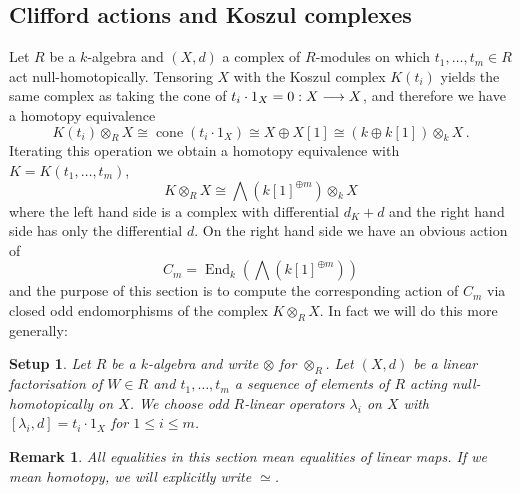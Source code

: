 \documentclass[english,letter paper,12pt,leqno]{article}
\newtheorem{setup}[theorem]{Setup}
\theoremstyle{example}
\newtheorem{remark}[theorem]{Remark}
\numberwithin{equation}{section}
\def\be{\begin{equation}}
\def\ee{\end{equation}}
\DeclareMathOperator{\End}{End}
\begin{document}
\subsection{Clifford actions and Koszul complexes}\label{section:cliffordactkos}

Let $R$ be a $k$-algebra and $(X,d)$ a complex of $R$-modules on which $t_1,\ldots,t_m \in R$ act null-homotopically. Tensoring $X$ with the Koszul complex $K(t_i)$ yields the same complex as taking the cone of $t_i \cdot 1_X = 0: X \longrightarrow X$, and therefore we have a homotopy equivalence
\be
K(t_i) \otimes_R X \cong \operatorname{cone}( t_i \cdot 1_X ) \cong X \oplus X[1] \cong ( k \oplus k[1] ) \otimes_k X\,.
\ee
Iterating this operation we obtain a homotopy equivalence with $K = K(t_1,\ldots,t_m)$,
\be\label{eq:cliffordactkos_1}
K \otimes_R X \cong \bigwedge( k[1]^{\oplus m} ) \otimes_k X
\ee
where the left hand side is a complex with differential $d_K + d$ and the right hand side has only the differential $d$. On the right hand side we have an obvious action of
\be
C_m = \End_k\left( \bigwedge( k[1]^{\oplus m} ) \right)
\ee
and the purpose of this section is to compute the corresponding action of $C_m$ via closed odd endomorphisms of the complex $K \otimes_R X$. In fact we will do this more generally:

\begin{setup} Let $R$ be a $k$-algebra and write $\otimes$ for $\otimes_R$. Let $(X,d)$ be a linear factorisation of $W \in R$ and $t_1,\ldots,t_m$ a sequence of elements of $R$ acting null-homotopically on $X$. We choose odd $R$-linear operators $\lambda_i$ on $X$ with $[\lambda_i, d] = t_i \cdot 1_X$ for $1 \le i \le m$.
\end{setup}

\begin{remark} All equalities in this section mean equalities of linear maps. If we mean homotopy, we will explicitly write $\simeq$.
\end{remark}
\end{document}
